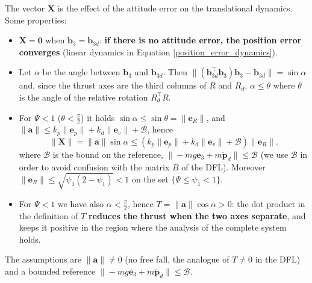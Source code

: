 \documentclass[10pt, a4paper]{report}
\begin{document}
The vector $\mathbf X$ is the effect of the attitude error on the translational dynamics. Some properties:\begin{itemize}
    \item $\mathbf X=\mathbf 0$ when $\mathbf b_3=\mathbf b_{3d}$: \textbf{if there is no attitude error, the position error converges} (linear dynamics in Equation \eqref{position_error_dynamics}).
    \item Let $\alpha$ be the angle between $\mathbf b_3$ and $\mathbf b_{3d}$. Then $\|(\mathbf b_{3d}^\top\mathbf b_3)\mathbf b_3-\mathbf b_{3d}\|=\sin\alpha$ and, since the thrust axes are the third columns of $R$ and $R_d$, $\alpha\le\theta$ where $\theta$ is the angle of the relative rotation $R_d^\top R$. 
    \item For $\Psi<1$ ($\theta<\frac{\pi}{2}$) it holds $\sin\alpha\le\sin\theta=\|\mathbf e_R\|$, and $\|\mathbf a\|\le k_p\|\mathbf e_p\|+k_d\|\mathbf e_v\|+\mathcal B$, hence\begin{equation}\label{bound_X}
        \|\mathbf X\|=\|\mathbf a\|\sin\alpha\le\left(k_p\|\mathbf e_p\|+k_d\|\mathbf e_v\|+\mathcal B\right)\|\mathbf e_R\|.
    \end{equation}
    where $\mathcal B$ is the bound on the reference, $\|-mg\mathbf e_3+m\ddot{\mathbf p}_d\|\le\mathcal B$ (we use $\mathcal B$ in order to avoid confusion with the matrix $B$ of the DFL).  Moreover $\|\mathbf e_R\|\le\sqrt{\psi_1(2-\psi_1)}<1$ on the set $\{\Psi\le\psi_1<1\}$.
    \item For $\Psi<1$ we have also $\alpha<\frac{\pi}{2}$, hence $T=\|\mathbf a\|\cos\alpha>0$: the dot product in the definition of $T$ \textbf{reduces the thrust when the two axes separate}, and keeps it positive in the region where the analysis of the complete system holds.
\end{itemize}
The assumptions are $\|\mathbf a\|\ne0$ (no free fall, the analogue of $T\ne0$ in the DFL) and a bounded reference $\|-mg\mathbf e_3+m\ddot{\mathbf p}_d\|\le\mathcal B$.
\end{document}
